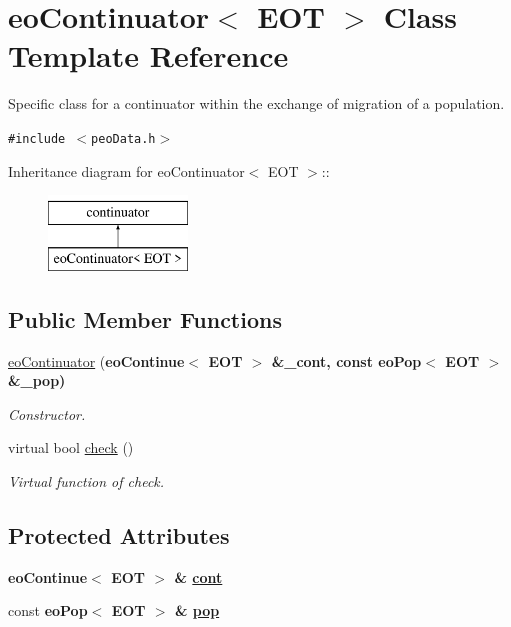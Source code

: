 \hypertarget{classeoContinuator}{
\section{eo\-Continuator$<$ EOT $>$ Class Template Reference}
\label{classeoContinuator}
}
Specific class for a continuator within the exchange of migration of a population.  


{\tt \#include $<$peo\-Data.h$>$}

Inheritance diagram for eo\-Continuator$<$ EOT $>$::\begin{figure}[H]
\begin{center}
\leavevmode
\includegraphics[height=2cm]{classeoContinuator}
\end{center}
\end{figure}
\subsection*{Public Member Functions}
\begin{CompactItemize}
\item 
\hyperlink{classeoContinuator_771e03f6ba647b2777dca2b8792fd317}{eo\-Continuator} (\bf{eo\-Continue}$<$ EOT $>$ \&\_\-cont, const \bf{eo\-Pop}$<$ EOT $>$ \&\_\-pop)
\begin{CompactList}\small\item\em Constructor. \item\end{CompactList}\item 
virtual bool \hyperlink{classeoContinuator_4e599bd4db85a57b44f9b94580eee178}{check} ()
\begin{CompactList}\small\item\em Virtual function of check. \item\end{CompactList}\end{CompactItemize}
\subsection*{Protected Attributes}
\begin{CompactItemize}
\item 
\bf{eo\-Continue}$<$ EOT $>$ \& \hyperlink{classeoContinuator_1c388d11915be8883f98a2511d598537}{cont}
\item 
\hypertarget{classeoContinuator_c10e809355df7bb763e4006ca02eab6c}{
const \bf{eo\-Pop}$<$ EOT $>$ \& \hyperlink{classeoContinuator_c10e809355df7bb763e4006ca02eab6c}{pop}}
\label{classeoContinuator_c10e809355df7bb763e4006ca02eab6c}

\end{CompactItemize}


